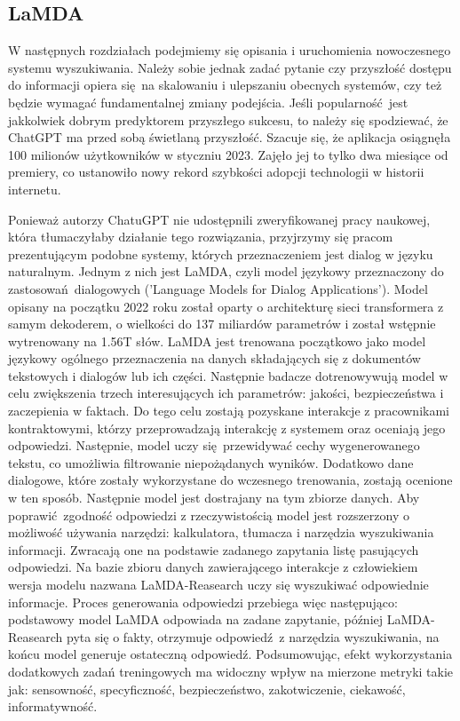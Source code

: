 \subsection{LaMDA}

W następnych rozdziałach podejmiemy się opisania i uruchomienia nowoczesnego systemu wyszukiwania. Należy sobie jednak zadać pytanie czy przyszłość dostępu do informacji opiera się na skalowaniu i ulepszaniu obecnych systemów, czy też będzie wymagać fundamentalnej zmiany podejścia. Jeśli popularność jest jakkolwiek dobrym predyktorem przyszłego sukcesu, to należy się spodziewać, że ChatGPT ma przed sobą świetlaną przyszłość. Szacuje się, że aplikacja osiągnęła 100 milionów użytkowników w styczniu 2023. Zajęło jej to tylko dwa miesiące od premiery, co ustanowiło nowy rekord szybkości adopcji technologii w historii internetu. \autocite{chatgpt100musers} \newline

Ponieważ autorzy ChatuGPT nie udostępnili zweryfikowanej pracy naukowej, która tłumaczyłaby działanie tego rozwiązania, przyjrzymy się pracom prezentującym podobne systemy, których przeznaczeniem jest dialog w języku naturalnym. Jednym z nich jest LaMDA, czyli model językowy przeznaczony do zastosowań dialogowych ('Language Models for Dialog Applications'). Model opisany na początku 2022 roku został oparty o architekturę sieci transformera z samym dekoderem, o wielkości do 137 miliardów parametrów i został wstępnie wytrenowany na 1.56T słów. \autocite{thoppilan2022lamda} LaMDA jest trenowana początkowo jako model językowy ogólnego przeznaczenia na danych składających się z dokumentów tekstowych i dialogów lub ich części. Następnie badacze dotrenowywują model w celu zwiększenia trzech interesujących ich parametrów: jakości, bezpieczeństwa i zaczepienia w faktach. Do tego celu zostają pozyskane interakcje z pracownikami kontraktowymi, którzy przeprowadzają interakcję z systemem oraz oceniają jego odpowiedzi. Następnie, model uczy się przewidywać cechy wygenerowanego tekstu, co umożliwia filtrowanie niepożądanych wyników. Dodatkowo dane dialogowe, które zostały wykorzystane do wczesnego trenowania, zostają ocenione w ten sposób. Następnie model jest dostrajany na tym zbiorze danych. \autocite{thoppilan2022lamda} Aby poprawić zgodność odpowiedzi z rzeczywistością model jest rozszerzony o możliwość używania narzędzi: kalkulatora, tłumacza i narzędzia wyszukiwania informacji. Zwracają one na podstawie zadanego zapytania listę pasujących odpowiedzi. Na bazie zbioru danych zawierającego interakcje z człowiekiem wersja modelu nazwana LaMDA-Reasearch uczy się wyszukiwać odpowiednie informacje. Proces generowania odpowiedzi przebiega więc następująco: podstawowy model LaMDA odpowiada na zadane zapytanie, później LaMDA-Reasearch pyta się o fakty, otrzymuje odpowiedź z narzędzia wyszukiwania, na końcu model generuje ostateczną odpowiedź. \autocite{thoppilan2022lamda} Podsumowując, efekt wykorzystania dodatkowych zadań treningowych ma widoczny wpływ na mierzone metryki takie jak: sensowność, specyficzność, bezpieczeństwo, zakotwiczenie, ciekawość, informatywność. \newline

